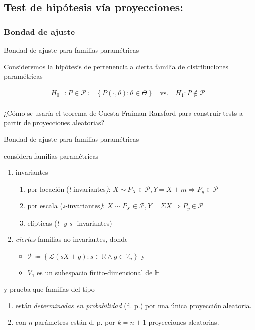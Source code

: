 \documentclass[10pt,spanish]{beamer}\usepackage[]{graphicx}\usepackage[]{color}
\begin{document}
\subsection{Test de hipótesis vía proyecciones:}

\subsubsection{Bondad de ajuste}
\begin{frame}{Bondad de ajuste para familias paramétricas}

Consideremos la hipótesis de pertenencia a cierta familia de distribuciones
paramétricas

\begin{align*}
H_{0} & :P\in\mathcal{P}\coloneqq\left\{ P\left(\cdot,\theta\right):\theta\in\Theta\right\} \quad\text{vs.}\quad H_{1}:P\notin\mathcal{P}\\
\end{align*}


\pause{}

¿Cómo se usaría el teorema de Cuesta-Fraiman-Ransford para construir
tests a partir de proyecciones aleatorias?
\end{frame}
%
\begin{frame}{Bondad de ajuste para familias paramétricas}

\cite{Cuesta 2007} considera familias paramétricas
\begin{enumerate}[<+->]
\item invariantes
\begin{enumerate}[<+->]
\item por locación (\emph{l-}invariantes\emph{)}: $X\sim P_{X}\in\mathcal{P},Y=X+m\Rightarrow P_{y}\in\mathcal{P}$
\item por escala (\emph{s-}invariantes\emph{)}: $X\sim P_{X}\in\mathcal{P},Y=\Sigma X\Rightarrow P_{y}\in\mathcal{P}$
\item elípticas (\emph{l- y s- }invariantes)
\end{enumerate}
\item \emph{ciertas }familias no-invariantes, donde
\begin{itemize}
\item $\mathcal{P}\coloneqq\left\{ \mathcal{L}\left(sX+g\right):s\in\mathbb{R}\land g\in V_{n}\right\} $
y
\item $V_{n}$ es un subespacio finito-dimensional de $\mathbb{H}$
\end{itemize}
\end{enumerate}

\pause{}

y prueba que familias del tipo
\begin{enumerate}[<+->]
\item están \emph{determinadas en probabilidad} (d. p.) por una única proyección
aleatoria.
\item con $n$ parámetros están d. p. por $k=n+1$ proyecciones aleatorias.
\end{enumerate}
\end{frame}
\end{document}

